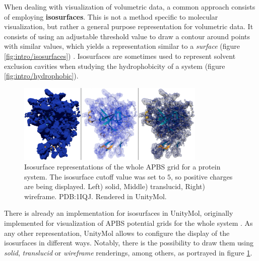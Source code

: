     When dealing with visualization of volumetric data, a common approach consists of employing \textbf{isosurfaces}. This is not a method specific to molecular visualization, but rather a general purpose representation for volumetric data. It consists of using an adjustable threshold value to draw a contour around points with similar values, which yields a representation similar to a \textit{surface} (figure \ref{fig:intro/isosurfaces}) \cite{isosurfaces_web}. Isosurfaces are sometimes used to represent solvent exclusion cavities when studying the hydrophobicity of a system (figure \ref{fig:intro/hydrophobic}).

    \begin{figure}[H]
      \centering
      \includegraphics[width=0.8\textwidth]{figures/intro/isosurfaces_umol.png}
      \caption{\label{fig:intro/isosurfaces_umol} Isosurface representations of the whole APBS grid for a protein system. The isosurface cutoff value was set to $5$, so positive charges are being displayed. Left) solid, Middle) translucid, Right) wireframe. PDB:1IQJ. Rendered in UnityMol.}
    \end{figure}

    There is already an implementation for isosurfaces in UnityMol, originally implemented for visualization of APBS potential grids for the whole system \cite{umol_apbs_2020}. As any other representation, UnityMol allows to configure the display of the isosurfaces in different ways. Notably, there is the possibility to draw them using \textit{solid}, \textit{translucid} or \textit{wireframe} renderings, among others, as portrayed in figure \ref{fig:intro/isosurfaces_umol}.



